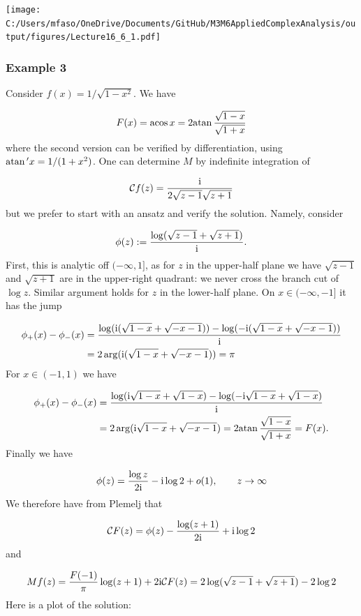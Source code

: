 \documentclass[12pt,landscape]{article}
\def\I{ {\rm i} }
\def\CC{ {\cal C} }
\def\acos{ {\rm acos}\, }
\def\atan{ {\rm atan}\, }
\begin{document}
{\texttt{[image: C:/Users/mfaso/OneDrive/Documents/GitHub/M3M6AppliedComplexAnalysis/output/figures/Lecture16\_6\_1.pdf]}

\subsubsection{Example 3}
Consider $f(x) = 1/\sqrt{1-x^2}$. We have

\[
F(x) = \acos x = 2 \atan {\sqrt{1-x} \over \sqrt{1+x}}
\]
where the second version can be verified by differentiation, using $\atan' x = 1/(1+x^2)$. One can determine $M$ by indefinite integration of

\[
\CC f(z) = {\I \over 2 \sqrt{z-1}\sqrt{z+1}}
\]
but we prefer to start with an ansatz and verify the solution. Namely, consider

\[
\phi(z) := {\log(\sqrt{z-1} + \sqrt{z+1}) \over \I}.
\]
First, this is analytic off $(-\infty,1]$, as for $z$ in the upper-half plane we have $\sqrt{z-1}$ and $\sqrt{z+1}$ are  in the upper-right quadrant: we never cross the branch cut of $\log z$. Similar argument holds for $z$ in the lower-half plane. On $x \in (-\infty,-1]$ it has the jump


\begin{align*}
\phi_+(x) - \phi_-(x) &= {\log(\I (\sqrt{1-x} + \sqrt{-x-1})) -  \log(-\I (\sqrt{1-x} + \sqrt{-x-1})) \over \I} \\
& =
        2 \arg(\I (\sqrt{1-x} + \sqrt{-x-1})) = \pi
\end{align*}
For $x \in (-1,1)$ we have


\begin{align*}
\phi_+(x) - \phi_-(x) &= {\log(\I \sqrt{1-x} + \sqrt{1-x}) -  \log(-\I \sqrt{1-x} + \sqrt{1-x}) \over \I} \\
& =
        2 \arg(\I \sqrt{1-x} + \sqrt{-x-1}) = 2 \atan {\sqrt{1-x} \over \sqrt{1+x}} = F(x).
\end{align*}
Finally we have

\[
\phi(z) = {\log z \over 2 \I} - \I \log 2 + o(1), \qquad z \to \infty
\]
We therefore have from Plemelj that

\[
\CC F(z) = \phi(z) - {\log(z+1) \over 2 \I} + \I \log 2
\]
and

\[
Mf(z) = {F(-1)\over \pi} \log(z+1)  + 2 \I \CC F(z) =2\log(\sqrt{z-1} + \sqrt{z+1}) -2 \log 2
\]
Here is a plot of the solution:


}
\end{document}

